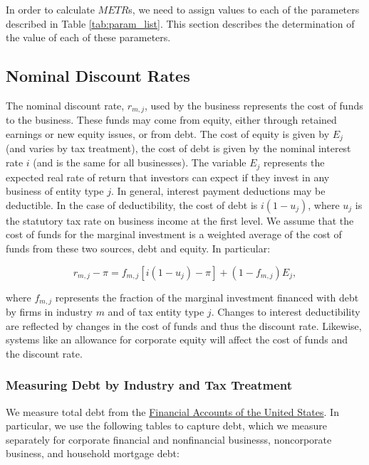 \documentclass[article,11pt,letterpaper,fleqn]{article}
\theoremstyle{definition}
\numberwithin{equation}{section}
\begin{document}
In order to calculate $METR$s, we need to assign values to each of the parameters described in Table \ref{tab:param_list}.  This section describes the determination of the value of each of these parameters.



\subsection{Nominal Discount Rates}

The nominal discount rate, $r_{m,j}$, used by the business represents the cost of funds to the business.  These funds may come from equity, either through retained earnings or new equity issues, or from debt.  The cost of equity is given by $E_{j}$ (and varies by tax treatment), the cost of debt is given by the nominal interest rate $i$ (and is the same for all businesses).  The variable $E_{j}$ represents the expected real rate of return that investors can expect if they invest in any business of entity type $j$.  In general, interest payment deductions may be deductible.  In the case of deductibility, the cost of debt is  $i(1-u_{j})$, where $u_{j}$ is the statutory tax rate on business income at the first level.  We assume that the cost of funds for the marginal investment is a weighted average of the cost of funds from these two sources, debt and equity.  In particular:

\begin{equation}
r_{m,j}-\pi = f_{m,j}\left[i(1-u_{j})-\pi\right] + (1-f_{m,j})E_{j},
\end{equation}

\noindent\noindent where $f_{m,j}$ represents the fraction of the marginal investment financed with debt by firms in industry $m$ and of tax entity type $j$.  Changes to interest deductibility are reflected by changes in the cost of funds and thus the discount rate.  Likewise, systems like an allowance for corporate equity will affect the cost of funds and the discount rate.

\subsubsection{Measuring Debt by Industry and Tax Treatment}
\label{sec:step3}

We measure total debt from the \href{http://www.federalreserve.gov/apps/fof/FOFTables.aspx}{Financial Accounts of the United States}.  In particular, we use the following tables to capture debt, which we measure separately for corporate financial and nonfinancial businesss, noncorporate business, and household mortgage debt:
\end{document}
